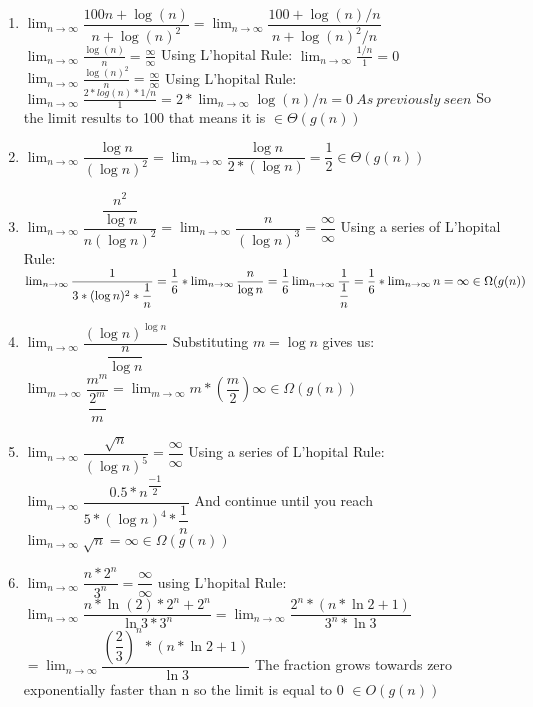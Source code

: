 \documentclass{report}
\begin{document}
	
	\begin{enumerate}
		\item $ \lim_{n \to \infty} \dfrac{100n + \log(n)}{n + \log(n)^{2}} = \lim_{n \to \infty} \dfrac{100 + \log(n) / n}{n + \log(n)^{2} / n}$ 
		\newline $\lim_{n \to \infty} \frac{\log(n)}{n} = \frac{\infty}{\infty}$
		Using L'hopital Rule: $\lim_{n \to \infty} \frac{1/n}{1} = 0$
		\newline $\lim_{n \to \infty} \frac{\log(n)^{2}}{n} = \frac{\infty}{\infty}$
		Using L'hopital Rule: $\lim_{n \to \infty} \frac{2*log(n)*1/n}{1} = 2*\lim_{n \to \infty}\log(n)/n = 0 ~As ~previously ~seen$
		\newline So the limit results to 100 that means it is $\in\Theta(g(n))$
		
		\item $\lim_{n \to \infty} \dfrac{\log n}{(\log n)^2} = \lim_{n \to \infty} \dfrac{\log n}{2*(\log n)} = \dfrac{1}{2} \in\Theta(g(n))$
		
		\item $\lim_{n \to \infty} \dfrac{\dfrac{n^2}{\log n}}{n (\log n)^2} = \lim_{n \to \infty} \dfrac{n}{(\log n)^3} = \dfrac{\infty}{\infty}$
		\newline Using a series of  L'hopital Rule: $\lim_{n \to \infty} \dfrac{1}{3*(\log n)^2 * \dfrac{1}{n}} = \dfrac{1}{6} * \lim_{n \to \infty} \dfrac{n}{\log n} = \dfrac{1}{6} \lim_{n \to \infty} \dfrac{1}{\dfrac{1}{n}} 
		\newline= \dfrac{1}{6}* \lim_{n \to \infty} n = \infty \in \Omega(g(n))$ 
		
		\item $\lim_{n \to \infty} \dfrac{(\log n)^{\log n}}{\dfrac{n}{\log n}}$ Substituting $m = \log n$ gives us:
		\newline $\lim_{m \to \infty} \dfrac{m^m}{\dfrac{2^m}{m}} = \lim_{m \to \infty} m * (\dfrac{m}{2}) \infty \in \Omega (g(n))$
		
		\item $\lim_{n \to \infty}\dfrac{\sqrt{n}}{(\log n)^5} = \dfrac{\infty}{\infty}$
		\newline Using a series of L'hopital Rule: $\lim_{n \to \infty} \dfrac{0.5*n^{\dfrac{-1}{2}}}{5*(\log n)^4 * \dfrac{1}{n}}$ 
		\newline And continue until you reach $\lim_{n \to \infty} \sqrt{n} = \infty \in \Omega (g(n))$ 
		
		\item $\lim_{n \to \infty} \dfrac{n * 2^n}{3^n} = \dfrac{\infty}{\infty}$
		\newline using L'hopital Rule: $\lim_{n \to \infty} \dfrac{n * \ln(2) * 2^n + 2^n}{\ln3 * 3^n} = \lim_{n \to \infty} \dfrac{2^n*(n*\ln2 + 1)}{3^n*\ln3}$
		\newline $= \lim_{n \to \infty} \dfrac{(\dfrac{2}{3})^n * (n*\ln2 + 1)}{\ln3}$
		The fraction grows towards zero exponentially faster than n so the limit is equal to 0 $\in O(g(n))$
		

\end{enumerate}
\end{document}
